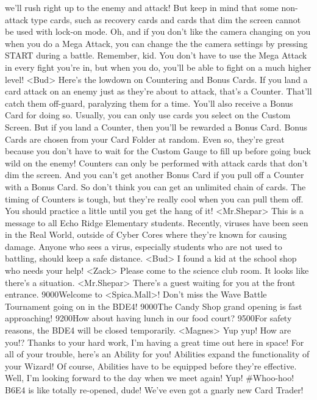 we'll rush right up to the enemy and attack! 
But keep in mind that some non-attack type cards, 
such as recovery cards and cards that dim 
the screen cannot be used with lock-on mode. 
Oh, and if you don't like the camera changing on 
you when you do a Mega Attack, 
you can change the the camera settings 
by pressing START during a battle. 
Remember, kid. You don't have to use 
the Mega Attack in every fight you're in, but when you 
do, you'll be able to fight on a much higher level! 
<Bud> Here's the lowdown on Countering and Bonus Cards. 
If you land a card attack on an enemy 
just as they're about to attack, that's a Counter. 
That'll catch them off-guard, paralyzing them for a time. 
You'll also receive a Bonus Card for doing so. 
Usually, you can only use cards you select on the Custom Screen. But if you 
land a Counter, then you'll be rewarded a Bonus Card. 
Bonus Cards are chosen from your Card Folder at random. 
Even so, they're great because you don't have to wait for the Custom Gauge 
to fill up before going buck wild on the enemy! 
Counters can only be performed with attack cards that don't dim the screen. 
And you can't get another Bonus Card if you pull off a Counter with a Bonus Card. 
So don't think you can get an unlimited chain of cards. 
The timing of Counters is tough, but they're really cool when you can pull them off. 
You should practice a little until you get the hang of it! 
<Mr.Shepar> This is a message to all Echo Ridge Elementary students. 
Recently, viruses have been seen in the Real World, outside of Cyber Cores 
where they're known for causing damage. Anyone who sees a virus, 
especially students who are not used to battling, should keep a safe distance. 
<Bud> I found a kid at the school shop who needs your help! 
<Zack> Please come to the science club room. It looks like there's a situation. 
<Mr.Shepar> There's a guest waiting for you at the front entrance. 
{90}{00}Welcome to <Spica.Mall>! 
Don't miss the Wave Battle Tournament going on in the {BD}{E4}! 
{90}{00}The Candy Shop grand opening is fast approaching! 
{92}{00}How about having lunch in our food court? 
{95}{00}For safety reasons, the {BD}{E4} will be closed temporarily. 
<Magnes> Yup yup! How are you!? Thanks to your hard work, 
I'm having a great time out here in space! 
For all of your trouble, here's an Ability for you! 
Abilities expand the functionality of your Wizard! 
Of course, Abilities have to be equipped before they're effective. 
Well, I'm looking forward to the day when we meet again! Yup! 
#Whoo-hoo! {B6}{E4} is like totally re-opened, dude! 
We've even got a gnarly new Card Trader! 
